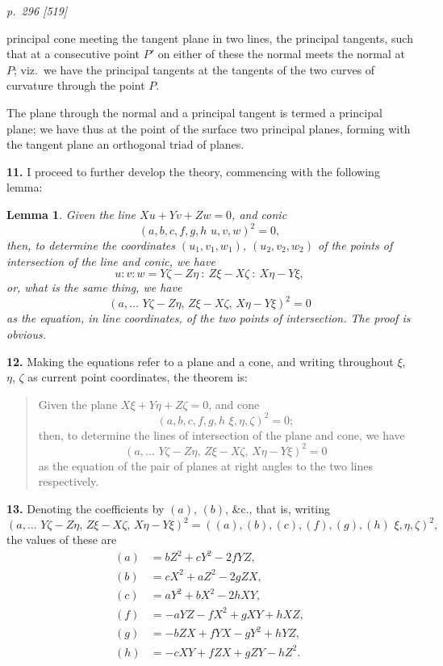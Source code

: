 \documentclass[11pt,a4paper]{article}
\theoremstyle{plain}
\newtheorem*{lemma*}{Lemma}
\begin{document}
\bigskip
\textit{p.~296 [519]}
\smallskip

\noindent principal cone meeting the tangent plane in two lines, the principal tangents, such
that at a consecutive point $P'$ on either of these the normal meets the normal at $P$;
viz.\ we have the principal tangents at the tangents of the two curves of curvature
through the point $P$.

The plane through the normal and a principal tangent is termed a principal
plane; we have thus at the point of the surface two principal planes, forming with the
tangent plane an orthogonal triad of planes.

\textbf{11.} I proceed to further develop the theory, commencing with the following lemma:

\begin{lemma*}
Given the line $Xu + Yv + Zw = 0$, and conic
\[
(a, b, c, f, g, h\,\,u, v, w)^2 = 0,
\]
then, to determine the coordinates $(u_1, v_1, w_1)$, $(u_2, v_2, w_2)$ of the points of intersection
of the line and conic, we have
\[
u : v : w = Y\zeta - Z\eta\ :\ Z\xi - X\zeta\ :\ X\eta - Y\xi,
\]
or, what is the same thing, we have
\[
(a, \ldots\,\,Y\zeta - Z\eta,\, Z\xi - X\zeta,\, X\eta - Y\xi)^2 = 0
\]
as the equation, in line coordinates, of the two points of intersection.  The proof is
obvious.
\end{lemma*}

\textbf{12.} Making the equations refer to a plane and a cone, and writing throughout
$\xi$, $\eta$, $\zeta$ as current point coordinates, the theorem is:

\begin{quote}
Given the plane $X\xi + Y\eta + Z\zeta = 0$, and cone
\[
(a, b, c, f, g, h\,\,\xi, \eta, \zeta)^2 = 0;
\]
then, to determine the lines of intersection of the plane and cone, we have
\[
(a, \ldots\,\,Y\zeta - Z\eta,\, Z\xi - X\zeta,\, X\eta - Y\xi)^2 = 0
\]
as the equation of the pair of planes at right angles to the two lines respectively.
\end{quote}

\textbf{13.} Denoting the coefficients by $(a)$, $(b)$, \&c., that is, writing
\[
(a, \ldots\,\,Y\zeta - Z\eta,\, Z\xi - X\zeta,\, X\eta - Y\xi)^2 = ((a), (b), (c), (f), (g), (h)\,\,\xi, \eta, \zeta)^2,
\]
the values of these are
\begin{align*}
(a) &= bZ^2 + cY^2 - 2fYZ, \\
(b) &= cX^2 + aZ^2 - 2gZX, \\
(c) &= aY^2 + bX^2 - 2hXY, \\
(f) &= -aYZ - fX^2 + gXY + hXZ, \\
(g) &= -bZX + fYX - gY^2 + hYZ, \\
(h) &= -cXY + fZX + gZY - hZ^2.
\end{align*}
\end{document}
